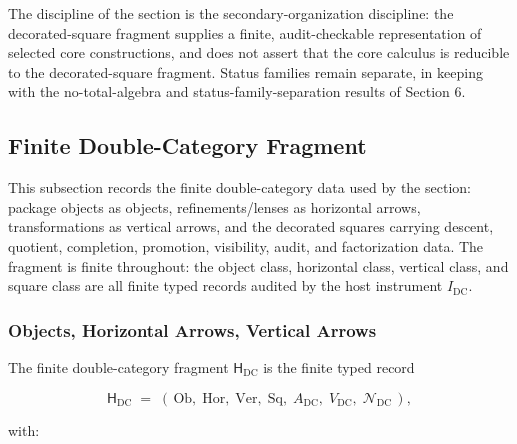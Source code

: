 \documentclass[11pt]{article}
\theoremstyle{definition}
\begin{document}
The discipline of the section is the secondary-organization discipline: the decorated-square fragment supplies a finite, audit-checkable representation of selected core constructions, and does not assert that the core calculus is reducible to the decorated-square fragment. Status families remain separate, in keeping with the no-total-algebra and status-family-separation results of Section 6.

\subsection{Finite Double-Category Fragment}

This subsection records the finite double-category data used by the section: package objects as objects, refinements/lenses as horizontal arrows, transformations as vertical arrows, and the decorated squares carrying descent, quotient, completion, promotion, visibility, audit, and factorization data. The fragment is finite throughout: the object class, horizontal class, vertical class, and square class are all finite typed records audited by the host instrument \(I_{\mathrm{DC}}\).

\subsubsection{Objects, Horizontal Arrows, Vertical Arrows}

The finite double-category fragment \(\mathsf H_{\mathrm{DC}}\) is the finite typed record

\[
\mathsf H_{\mathrm{DC}}\;=\;(\,\mathrm{Ob},\;\mathrm{Hor},\;\mathrm{Ver},\;\mathrm{Sq},\;A_{\mathrm{DC}},\;V_{\mathrm{DC}},\;\mathcal N_{\mathrm{DC}}\,),
\]

with:
\end{document}

